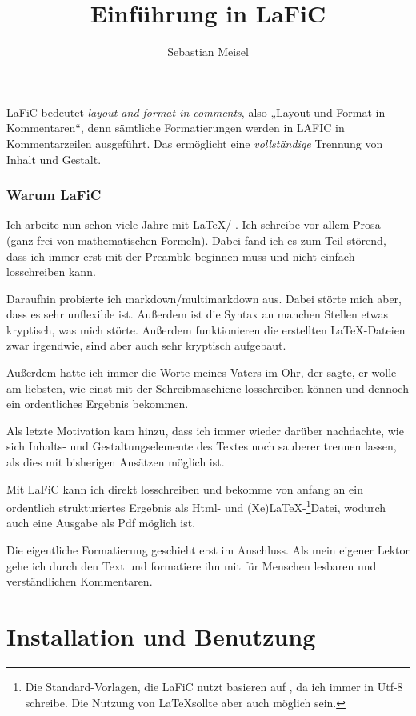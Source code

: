 \documentclass{scrartcl}
\title{Einführung in LaFiC}
\author{Sebastian Meisel}
\begin{document}
\maketitle


LaFiC bedeutet \textit{layout and format in comments}, also „Layout
und Format in Kommentaren“, denn sämtliche Formatierungen
werden in LAFIC in Kommentarzeilen ausgeführt. Das
ermöglicht eine \emph{vollständige} Trennung von Inhalt und
Gestalt.

\section{Warum LaFiC}

Ich arbeite nun schon viele Jahre mit \LaTeX / \XeLaTeX. Ich schreibe vor allem Prosa (ganz frei von mathematischen Formeln). Dabei fand ich es zum Teil störend, dass ich immer erst mit der Preamble beginnen muss und nicht einfach losschreiben kann.

Daraufhin probierte ich markdown/multimarkdown aus. Dabei störte mich aber, dass es sehr unflexible ist. Außerdem ist die Syntax an manchen Stellen etwas kryptisch, was mich störte. Außerdem funktionieren die erstellten \LaTeX-Dateien zwar irgendwie, sind aber auch sehr kryptisch aufgebaut.

Außerdem hatte ich immer die Worte meines Vaters im Ohr, der sagte, er wolle am liebsten, wie einst mit der Schreibmaschiene losschreiben können und dennoch ein ordentliches Ergebnis bekommen.

Als letzte Motivation kam hinzu, dass ich immer wieder darüber nachdachte, wie sich Inhalts- und Gestaltungselemente des Textes noch sauberer trennen lassen, als dies mit bisherigen Ansätzen möglich ist.

Mit LaFiC kann ich direkt losschreiben und bekomme von anfang an ein ordentlich strukturiertes Ergebnis als Html- und (Xe)LaTeX-\footnote{Die Standard-Vorlagen, die LaFiC nutzt basieren auf \XeLaTeX, da ich immer in Utf-8 schreibe. Die Nutzung von \LaTeX sollte aber auch möglich sein.}Datei, wodurch auch  eine Ausgabe als Pdf möglich ist.

Die eigentliche Formatierung geschieht erst im Anschluss. Als mein eigener Lektor gehe ich durch den Text und formatiere ihn mit für Menschen lesbaren und verständlichen Kommentaren.

\part{Installation und Benutzung}
\end{document}
